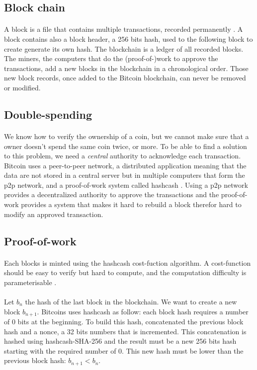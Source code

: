 \documentclass[letterpaper]{article}
\begin{document}
\subsection{Block chain}
\paragraph{}
A block is a file that contains multiple transactions,
recorded permanently \cite{bitcoinwiki}. A block contains also a block header,
a 256 bits hash, used to the following block to create generate its own hash.
The blockchain is a ledger of all
recorded blocks. The miners, the computers that do the (proof-of-)work to
approve the transactions, add a new blocks in the blockchain in a
chronological order. Those new block records,
once added to the Bitcoin blockchain, can never be removed or modified.



\subsection{Double-spending}
\paragraph{}
We know how to verify the ownership of a coin, but we cannot make sure
that a owner doesn't spend the same coin twice, or more.
To be able to find a solution to this problem, we need a \textit{central}
authority to acknowledge each transaction. Bitcoin uses a peer-to-peer network,
a distributed application meaning that the data are not stored in a
central server but in multiple computers that form the p2p network,
and a proof-of-work system called hashcash \cite{hashcash}. Using a p2p network
provides a decentralized authority to approve the transactions and the proof-of-work
provides a system that makes it hard to rebuild a block therefor hard to modify
an approved transaction.

\subsection{Proof-of-work}
\paragraph{}
Each blocks is minted using the hashcash cost-fuction algorithm.
A cost-function should be easy to verify but hard to compute, and the
computation difficulty is parameterisable \cite{hashcash}.
\paragraph{}
Let $b_n$ the hash
of the last block in the blockchain.
We want to create a new block $b_{n+1}$. Bitcoins uses hashcash as follow:
each block hash requires a number of 0 bits at the beginning. To build this
hash, concatenated the previous block hash and a nonce, a 32 bits numbers
that is incremented. This concatenation is hashed using hashcash-SHA-256
and the result
must be a new 256 bits hash starting with the required number of 0. This new
hash must be lower than the previous block hash: $b_{n+1} < b_n$.



\end{document}
